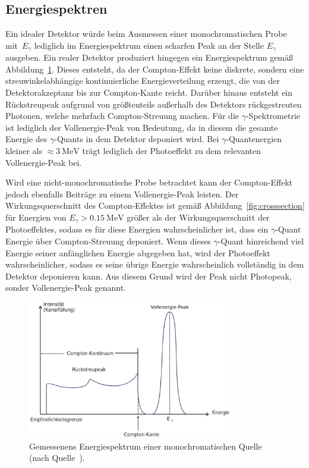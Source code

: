 \subsection{Energiespektren}
\label{subsec:energiespektrum}

Ein idealer Detektor würde beim Ausmessen einer monochromatischen Probe mit~$E_\gamma$
lediglich im Energiespektrum einen scharfen Peak an der Stelle $E_\gamma$
ausgeben. Ein realer Detektor produziert hingegen ein Energiespektrum gemäß
Abbildung~\ref{fig:spektrum}. Dieses entsteht, da der Compton-Effekt
keine diskrete, sondern eine streuwinkelabhängige kontinuierliche Energieverteilung
erzeugt, die von der Detektorakzeptanz bis zur Compton-Kante reicht.
Darüber hinaus entsteht ein Rückstreupeak aufgrund von größtenteils
außerhalb des Detektors rückgestreuten Photonen, welche mehrfach Compton-Streuung
machen.
Für die $\gamma$-Spektrometrie ist lediglich der Vollenergie-Peak
von Bedeutung, da in diesem die gesamte Energie des $\gamma$-Quants
in dem Detektor deponiert wird. Bei $\gamma$-Quantenergien kleiner
als $\approx\SI{3}{\MeV}$ trägt lediglich der Photoeffekt zu dem relevanten
Vollenergie-Peak bei.

Wird eine nicht-monochromatische Probe betrachtet kann der Compton-Effekt
jedoch ebenfalls Beiträge zu einem Vollenergie-Peak leisten.
Der Wirkungsquerschnitt des Compton-Effektes ist gemäß Abbildung~\ref{fig:crosssection}
für Energien von $E_\gamma>\SI{0.15}{\MeV}$ größer als der Wirkungsquerschnitt
der Photoeffektes, sodass es für diese Energien wahrscheinlicher ist, dass ein $\gamma$-Quant
Energie über Compton-Streuung deponiert. Wenn dieses $\gamma$-Quant
hinreichend viel Energie seiner anfänglichen Energie abgegeben hat,
wird der Photoeffekt wahrscheinlicher, sodass es seine übrige Energie wahrscheinlich
vollständig in dem Detektor deponieren kann.
Aus diesem Grund wird der Peak nicht Photopeak, sonder Vollenergie-Peak genannt.

\begin{figure}
  \centering
  \includegraphics[width=0.8\textwidth]{Pics/spektrum.pdf}
  \caption{Gemessenens Energiespektrum einer monochromatischen Quelle (nach Quelle~\cite{anleitung}).}
  \label{fig:spektrum}
\end{figure}
\FloatBarrier
